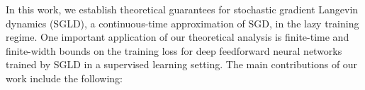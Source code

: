 \documentclass[10pt]{article} %
\begin{document}
In this work, we establish theoretical guarantees for stochastic gradient Langevin dynamics (SGLD), a continuous-time approximation of SGD, in the lazy training regime. One important application of our theoretical analysis is finite-time and finite-width bounds on the training loss for deep feedforward neural networks trained by SGLD in a supervised learning setting. The main contributions of our work include the following:
\end{document}
